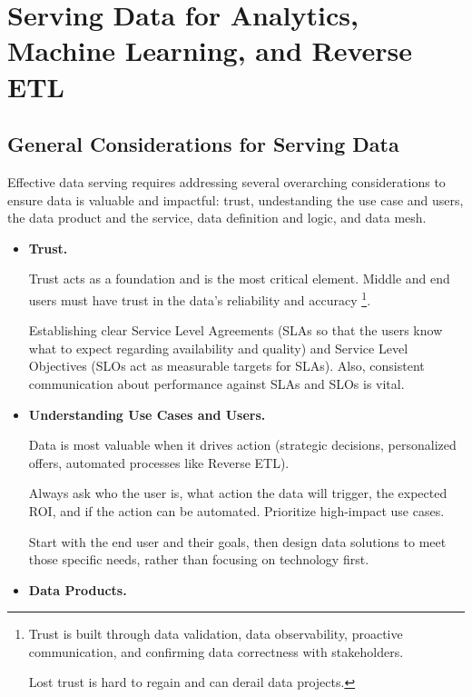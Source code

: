 \section{Serving Data for Analytics, Machine Learning, and Reverse ETL}



\subsection{General Considerations for Serving Data}
Effective data serving requires addressing several overarching
considerations to ensure data is valuable and impactful:
trust, undestanding the use case and users, the data product 
and the service, data definition and logic, and data mesh.

\begin{itemize}
    \item \textbf{Trust.}
    
    \noindent
    Trust acts as a foundation and is the most critical element.
    Middle and end users must have trust in the data's reliability
    and accuracy
    \footnote{
        Trust is built through data validation, data observability,
        proactive communication, and confirming data correctness with
        stakeholders.
    
        Lost trust is hard to regain and can derail data projects.
    }.

    Establishing clear Service Level Agreements (SLAs so that
    the users know what to expect regarding availability and
    quality) and Service Level Objectives (SLOs act as
    measurable targets for SLAs). Also, consistent communication
    about performance against SLAs and SLOs is vital.


    \item \textbf{Understanding Use Cases and Users.}
    
    \noindent
    Data is most valuable when it drives action (strategic decisions,
    personalized offers, automated processes like Reverse ETL).

    Always ask who the user is, what action the data will trigger,
    the expected ROI, and if the action can be automated.
    Prioritize high-impact use cases.

    Start with the end user and their goals, then design data
    solutions to meet those specific needs, rather than focusing
    on technology first.


    \item \textbf{Data Products.}
    

\end{itemize}
